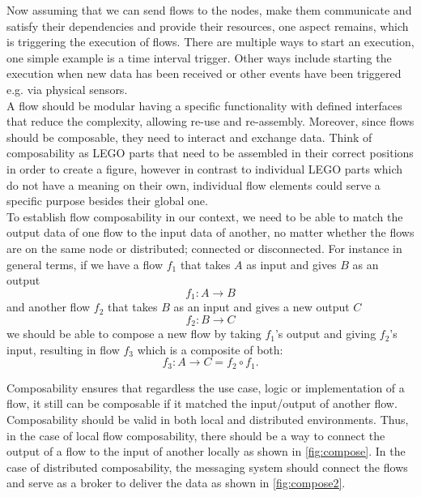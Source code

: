\noindent Now assuming that we can send flows to the nodes, make them communicate and satisfy their dependencies and provide their resources, one aspect remains, which is triggering the execution of flows. There are multiple ways to start an execution, one simple example is a time interval trigger. Other ways include starting the execution when new data has been received or other events have been triggered e.g. via physical sensors.\\


\noindent A flow should be modular having a specific functionality with defined interfaces that reduce the complexity, allowing re-use and re-assembly. Moreover, since flows should be composable, they need to interact and exchange data. Think of composability as LEGO parts that need to be assembled in their correct positions in order to create a figure, however in contrast to individual LEGO parts which do not have a meaning on their own, individual flow elements could serve a specific purpose besides their global one. \\
 
\noindent  To establish flow composability in our context, we need to be able to match the output data of one flow to the input data of another, no matter whether the flows are on the same node or distributed; connected or disconnected. For instance in general terms, if we have a flow \(f_1\) that takes \(A\) as input and gives \(B\) as an output
\[ f_1 : A  \to B  \]
and another flow \(f_2\) that takes \(B\) as an input and gives a new output \(C\)
\[ f_2 : B  \to C  \]
we should be able to compose a new flow by taking \(f_1\)'s output and giving \(f_2\)'s input, resulting in flow \(f_3\) which is a composite of both:
\[f_3: A \to C = f_2 \circ f_1 .\]

 \noindent Composability ensures that regardless the use case, logic or implementation of a flow, it still can be composable if it matched the input/output of another flow. Composability should be valid in both local and distributed environments. Thus, in the case of local flow composability, there should be a way to connect the output of a flow to the input of another locally as shown in \ref{fig:compose}. In the case of distributed composability, the messaging system should connect the flows and serve as a broker to deliver the data as shown in \ref{fig:compose2}. 

